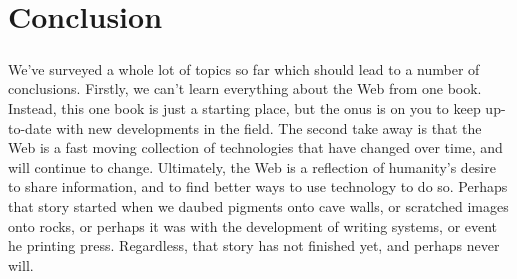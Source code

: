 \chapter{Conclusion}
\label{conclusion}
\paragraph{} We've surveyed a whole lot of topics so far which should lead to a number of conclusions. Firstly, we can't learn everything about the Web from one book. Instead, this one book is just a starting place, but the onus is on you to keep up-to-date with new developments in the field. The second take away is that the Web is a fast moving collection of technologies that have changed over time, and will continue to change. Ultimately, the Web is a reflection of humanity's desire to share information, and to find better ways to use technology to do so. Perhaps that story started when we daubed pigments onto cave walls, or scratched images onto rocks, or perhaps it was with the development of writing systems, or event he printing press. Regardless, that story has not finished yet, and perhaps never will.


